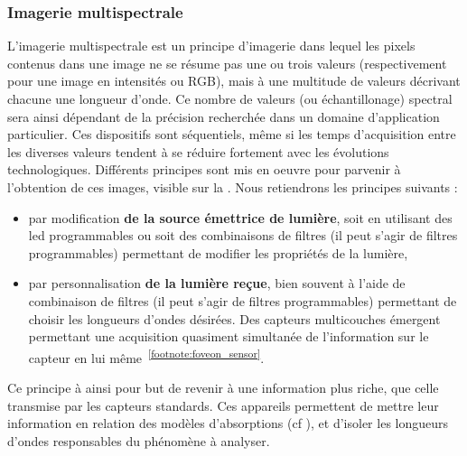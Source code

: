 \subsubsection{Imagerie multispectrale}
L'imagerie multispectrale est un principe d'imagerie dans lequel les pixels contenus dans une image ne se résume pas une ou trois valeurs (respectivement pour une image en intensités ou RGB), mais à une multitude de valeurs décrivant chacune une longueur d'onde. Ce nombre de valeurs (ou échantillonage) spectral sera ainsi dépendant de la précision recherchée dans un domaine d'application particulier. Ces dispositifs sont séquentiels, même si les temps d'acquisition entre les diverses valeurs tendent à se réduire fortement avec les évolutions technologiques. Différents principes sont mis en oeuvre pour parvenir à l'obtention de ces images, visible sur la . Nous retiendrons les principes suivants :
\begin{itemize}
\item par modification \textbf{de la source émettrice de lumière}, soit en utilisant des \gls{led} programmables ou soit des combinaisons de filtres (il peut s'agir de filtres programmables) permettant de modifier les propriétés de la lumière,
\item par personnalisation \textbf{de la lumière reçue}, bien souvent à l'aide de combinaison de filtres (il peut s'agir de filtres programmables) permettant de choisir les longueurs d'ondes désirées. Des capteurs multicouches émergent permettant une acquisition quasiment simultanée de l'information sur le capteur en lui même~\textsuperscript{\ref{footnote:foveon_sensor}}.
\end{itemize}\par

Ce principe à ainsi pour but de revenir à une information plus riche, que celle transmise par les capteurs standards. Ces appareils permettent de mettre leur information en relation des modèles d'absorptions (cf ), et d'isoler les longueurs d'ondes responsables du phénomène à analyser.\par 

\addtocounter{footnote}{1}


